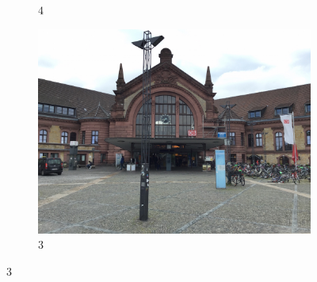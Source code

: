\begin{figure}[h]
\begin{subfigure}[t]{.33\textwidth}
      \caption{$4$}
   \end{subfigure}
   \begin{subfigure}[t]{.33\textwidth}
      \includegraphics[width=\textwidth]{gfx/bahnhof_imgs/4.JPG}
      \caption{$3$}
   \end{subfigure}


\end{figure}
